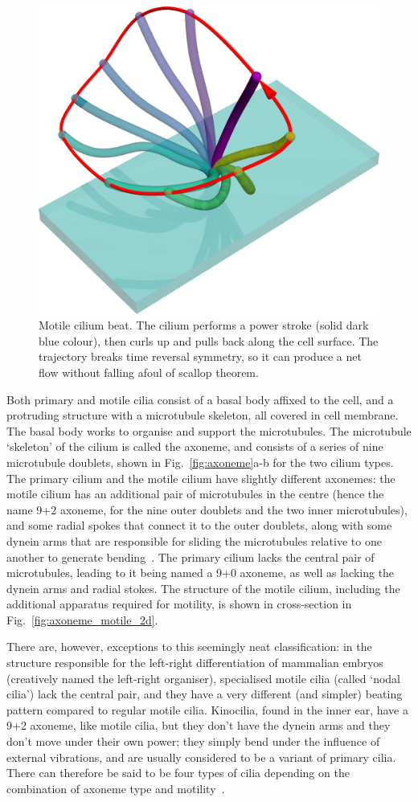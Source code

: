 \begin{figure}
    \centering
    \includegraphics[width=0.6\linewidth]{images_other/enhanced_motilebeat.png}
    \caption{Motile cilium beat. The cilium performs a power stroke (solid dark blue colour), then curls up and pulls back along the cell surface. The trajectory breaks time reversal symmetry, so it can produce a net flow without falling afoul of scallop theorem.}
    \label{fig:motile_beat}
\end{figure}

Both primary and motile cilia consist of a basal body affixed to the cell, and a protruding structure with a microtubule skeleton, all covered in cell membrane. The basal body works to organise and support the microtubules. The microtubule `skeleton' of the cilium is called the axoneme, and consists of a series of nine microtubule doublets, shown in Fig.~\ref{fig:axoneme}a-b for the two cilium types. The primary cilium and the motile cilium have slightly different axonemes: the motile cilium has an additional pair of microtubules in the centre (hence the name 9+2 axoneme, for the nine outer doublets and the two inner microtubules), and some radial spokes that connect it to the outer doublets, along with some dynein arms that are responsible for sliding the microtubules relative to one another to generate bending~. The primary cilium lacks the central pair of microtubules, leading to it being named a 9+0 axoneme, as well as lacking the dynein arms and radial stokes. The structure of the motile cilium, including the additional apparatus required for motility, is shown in cross-section in Fig.~\ref{fig:axoneme_motile_2d}.

There are, however, exceptions to this seemingly neat classification: in the structure responsible for the left-right differentiation of mammalian embryos (creatively named the left-right organiser), specialised motile cilia (called `nodal cilia') lack the central pair, and they have a very different (and simpler) beating pattern compared to regular motile cilia. Kinocilia, found in the inner ear, have a 9+2 axoneme, like motile cilia, but they don't have the dynein arms and they don't move under their own power; they simply bend under the influence of external vibrations, and are usually considered to be a variant of primary cilia. There can therefore be said to be four types of cilia depending on the combination of axoneme type and motility~\cite{falk_specialized_2015}.


